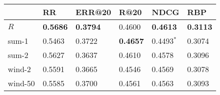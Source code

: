 \begin{tabular}{llllll}
\toprule
{} &               RR &           ERR@20 &             R@20 &             NDCG &              RBP \\
\midrule
$R$     &  \textbf{0.5686} &  \textbf{0.3794} &           0.4600 &  \textbf{0.4613} &  \textbf{0.3113} \\
sum-1   &           0.5463 &           0.3722 &  \textbf{0.4657} &     0.4493$^{*}$ &           0.3074 \\
sum-2   &           0.5627 &           0.3637 &           0.4610 &           0.4578 &           0.3096 \\
wind-2  &           0.5591 &           0.3665 &           0.4546 &           0.4569 &           0.3078 \\
wind-50 &           0.5585 &           0.3700 &           0.4561 &           0.4563 &           0.3093 \\
\bottomrule
\end{tabular}
